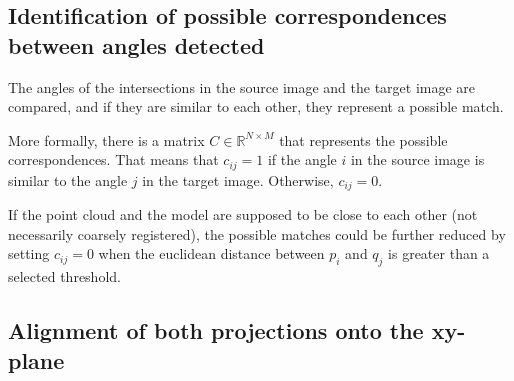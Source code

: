         \subsection{Identification of possible correspondences between angles detected}
            The angles of the intersections in the source image and the target image are compared,
            and if they are similar to each other, they represent a possible match.

            More formally, there is a matrix $C \in \mathbb{R}^{N \times M}$ that represents the possible correspondences.
            That means that $c_{ij} = 1$ if the angle $i$ in the source image is similar to the angle $j$ in the target image.
            Otherwise, $c_{ij} = 0$.

            If the point cloud and the model are supposed to be close to each other (not necessarily coarsely registered),
            the possible matches could be further reduced by setting $c_{ij} = 0$ when the euclidean distance between $p_i$
            and $q_j$ is greater than a selected threshold.

        \subsection{Alignment of both projections onto the xy-plane}
            \label{sub:Alignment of both projections onto the xy-plane}

